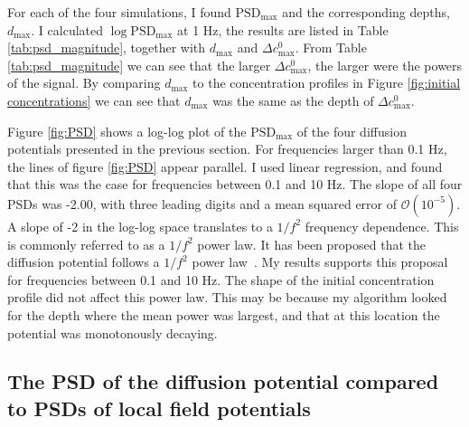 \documentclass{uiophd}
\begin{document}
For each of the four simulations, I found $\text{PSD}_{\text{max}}$ and the corresponding depths, $d_{\text{max}}$. I calculated $\log \text{PSD}_{\text{max}}$ at 1 Hz, the results are listed in Table \ref{tab:psd_magnitude}, together with $d_{\text{max}}$ and $\Delta c^0_{\text{max}}$. From Table  \ref{tab:psd_magnitude} we can see that the larger  $\Delta c^0_{\text{max}}$, the larger were the powers of the signal. By comparing $d_{\text{max}}$ to the concentration profiles in Figure \ref{fig:initial concentrations} we can see that $d_{\text{max}}$ was the same as the depth of $\Delta c^0_{\text{max}}$.




Figure \ref{fig:PSD} shows a log-log plot of the $\text{PSD}_{\text{max}}$ of the four diffusion potentials presented in the previous section.  For frequencies larger than 0.1 Hz, the lines of figure \ref{fig:PSD} appear parallel. I used linear regression, and found that this was the case for frequencies between 0.1 and 10 Hz. The slope of all four PSDs was -2.00, with three leading digits and a mean squared error of $\mathcal{O}(10^{-5})$. A slope of -2 in the log-log space translates to a $1/f^2$ frequency dependence. This is commonly referred to as a $1/f^2$ power law. It has been proposed that the diffusion potential follows a $1/f^2$ power law~\cite{Halnes2016}. My results supports this proposal for frequencies between 0.1 and 10 Hz. The shape of the initial concentration profile did not affect this power law. This may be because my algorithm looked for the depth where the mean power was largest, and that at this location the potential was monotonously decaying. 


\subsection{The PSD of the diffusion potential compared to PSDs of local field potentials}
\end{document}
